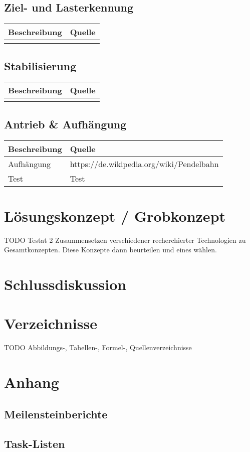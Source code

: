 \documentclass[a4paper]{report}
\begin{document}
\section{Ziel- und Lasterkennung}

\vspace{1em}
\noindent
\begin{tabular}{|l|l|}
	\hline 
	\textbf{Beschreibung} & \textbf{Quelle} \\
	\hline
	&  \\
	\hline
\end{tabular}

\section{Stabilisierung}

\vspace{1em}
\noindent
\begin{tabular}{|l|l|}
	\hline 
	\textbf{Beschreibung} & \textbf{Quelle} \\
	\hline
	 &  \\
	\hline
\end{tabular}

\section{Antrieb \& Aufhängung}

\vspace{1em}
\noindent
\begin{tabular}{|l|l|}
	\hline 
	\textbf{Beschreibung} & \textbf{Quelle} \\
	\hline
	Aufhängung & https://de.wikipedia.org/wiki/Pendelbahn  \\
	\hline
	Test & Test \\
	\hline
\end{tabular}

\vspace{1em}
\noindent



\chapter{Lösungskonzept / Grobkonzept}
TODO Testat 2
Zusammensetzen verschiedener recherchierter Technologien zu Gesamtkonzepten. Diese Konzepte dann beurteilen und eines wählen. 

\chapter{Schlussdiskussion}

\chapter{Verzeichnisse}
TODO Abbildungs-, Tabellen-, Formel-, Quellenverzeichnisse
\printbibliography

\chapter{Anhang}
\section{Meilensteinberichte}

\section{Task-Listen}
\end{document}
